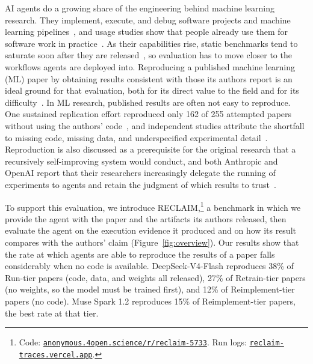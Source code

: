 \documentclass{article} %
\renewcommand{\UrlFont}{\small\ttfamily}  %
\begin{document}
AI agents do a growing share of the engineering behind machine learning
research. They implement, execute, and debug software projects and machine
learning pipelines~\citep{jimenez2024swebench,chan2024mlebench,
merrill2026terminalbench}, and usage studies show that people already use them
for software work in practice~\citep{handa2025economic,huang2025aiwork,murphyhill2026adoption}. As their capabilities rise,
static benchmarks tend to saturate soon after they are
released~\citep{kiela2021dynabench,phan2025hle,ott2022mapping,akhtar2026plateau}, so evaluation has to move
closer to the workflows agents are deployed into. Reproducing a published machine learning (ML) paper by
obtaining results consistent with those its authors report is an ideal
ground for that evaluation, both for its direct value to the field and for
its difficulty~\citep{siegel2024corebench,starace2025paperbench}. In ML
research, published results are often not easy to reproduce. One sustained
replication effort reproduced only 162 of 255 attempted papers without
using the authors' code~\citep{raff2019step}, and independent studies
attribute the shortfall to missing code, missing data, and underspecified
experimental detail~\citep{gundersen2018state,henderson2018deep,
pineau2021improving,gundersen2022sources,gundersen2025unreasonable}. Reproduction is also
discussed as a prerequisite for the original research that a recursively
self-improving system would conduct, and both Anthropic and OpenAI report that
their researchers increasingly delegate the running of experiments to agents
and retain the judgment of which results to
trust~\citep{favaro2026recursive,openai2026acceleration}.

To support this evaluation, we introduce RECLAIM,\footnote{\renewcommand{\UrlFont}{\fontsize{8}{9}\selectfont\ttfamily}Code:
\textcolor{blue}{\href{https://anonymous.4open.science/r/reclaim-5733}{\nolinkurl{anonymous.4open.science/r/reclaim-5733}}}.
Run logs: \textcolor{blue}{\href{https://reclaim-traces.vercel.app}{\nolinkurl{reclaim-traces.vercel.app}}}.\label{fn:artifacts}}
a benchmark in which we
provide the agent with the paper and the artifacts its authors released, then
evaluate the agent on the execution evidence it produced and on how its result
compares with the authors' claim (Figure~\ref{fig:overview}). Our results show that the rate at
which agents are able to reproduce the results of a paper falls considerably
when no code is available. DeepSeek-V4-Flash reproduces
38\% of Run-tier papers (code, data, and weights all
released), 27\% of Retrain-tier papers (no weights, so the model must
be trained first), and 12\% of Reimplement-tier papers (no code). Muse Spark 1.2 reproduces 15\% of Reimplement-tier papers, the
best rate at that tier.
\end{document}

